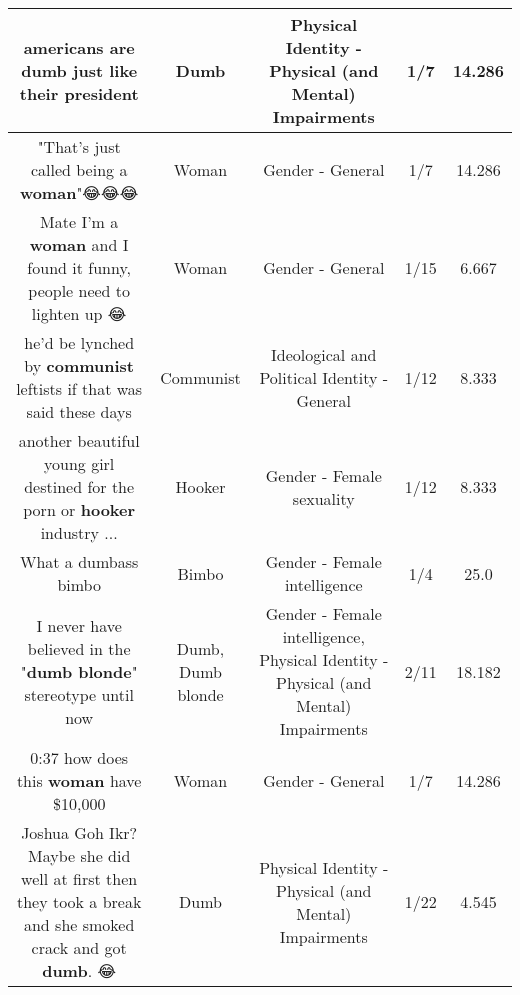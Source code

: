 \documentclass[11pt]{article}
\newlength\mylength
\begin{document}
\begin{center}
\begin{longtable}{|C{.65\mylength}|C{.30\mylength}|C{.12\mylength}|C{.12\mylength}|C{.12\mylength}|}
  \small americans are \textbf{dumb} just like their president\normalsize   & Dumb & Physical Identity - Physical (and Mental) Impairments & 1/7 & 14.286 \\  \hline
  \small "That's just called being a \textbf{woman}"😂😂😂\normalsize   & Woman & Gender - General & 1/7 & 14.286 \\  \hline
  \small Mate I'm a \textbf{woman} and I found it funny, people need to lighten up 😂\normalsize   & Woman & Gender - General & 1/15 & 6.667 \\  \hline
  \small he'd be lynched by \textbf{communist} leftists if that was said these days\normalsize   & Communist &  Ideological and Political Identity - General & 1/12 & 8.333 \\  \hline
  \small another beautiful young girl destined for the porn or \textbf{hooker} industry ...\normalsize   & Hooker & Gender - Female sexuality & 1/12 & 8.333 \\  \hline
  \small What a dumbass bimbo\normalsize   & Bimbo & Gender - Female intelligence & 1/4 & 25.0 \\  \hline
  \small I never have believed in the "\textbf{d\textbf{umb} blonde}" stereotype until now\normalsize   & Dumb, Dumb blonde & Gender - Female intelligence, Physical Identity - Physical (and Mental) Impairments & 2/11 & 18.182 \\  \hline
  \small 0:37 how does this \textbf{woman} have \$10,000\normalsize   & Woman & Gender - General & 1/7 & 14.286 \\  \hline
  \small Joshua Goh Ikr?Maybe she did well at first then they took a break and she smoked crack and got \textbf{dumb}. 😂\normalsize   & Dumb & Physical Identity - Physical (and Mental) Impairments & 1/22 & 4.545 \\  \hline

\end{longtable}
\end{center}
\end{document}

